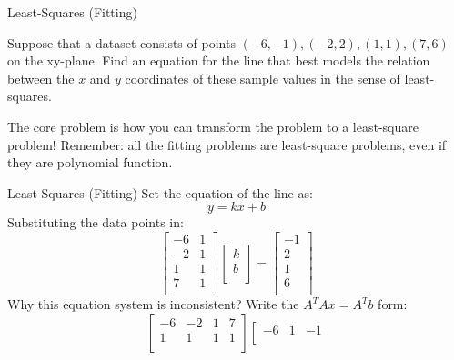 \documentclass{beamer}
\begin{document}
\begin{frame}{Least-Squares (Fitting)}
\begin{example}
    Suppose that a dataset consists of points $(-6, -1), (-2, 2), (1, 1), (7, 6)$ on the xy-plane. Find an equation for the line that best models the relation between the $x$ and $y$ coordinates of these sample values in the sense of least-squares.
\end{example}
The core problem is how you can transform the problem to a least-square problem! Remember: all the fitting problems are least-square problems, even if they are polynomial function.

\end{frame}

\begin{frame}{Least-Squares (Fitting)}
Set the equation of the line as:
    \begin{equation*}
        y=kx+b
    \end{equation*}
Substituting the data points in:
    \begin{equation*}
        \left[ \begin{matrix}
            -6&		1\\
            -2&		1\\
            1&		1\\
            7&		1\\
        \end{matrix} \right] \left[ \begin{array}{c}
            k\\
            b\\
        \end{array} \right] =\left[ \begin{array}{c}
            -1\\
            2\\
            1\\
            6\\
        \end{array} \right]
    \end{equation*}
Why this equation system is inconsistent? Write the $A^TAx=A^Tb$ form:
    \begin{equation*}
    \left[ \begin{matrix}
        -6&		-2&		1&		7\\
        1&		1&		1&		1\\
    \end{matrix} \right] \left[ \begin{matrix}
        -6&		1&		-1\\

\end{matrix}
\end{equation*}
\end{frame}
\end{document}
